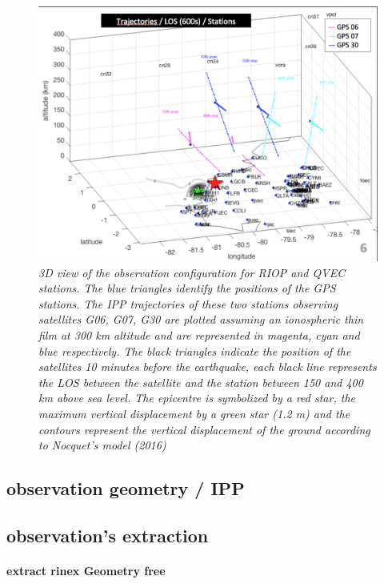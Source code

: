 \documentclass{gji}
\begin{document}
\begin{figure}
\begin{center}
\includegraphics[width=1\linewidth]{images/situation_map_3D.png}
\end{center}
\caption{ \textit{\emph{3D view of the observation configuration for RIOP and QVEC stations}. The blue triangles identify the positions of the GPS stations. The IPP trajectories of these two stations observing satellites G06, G07, G30 are plotted assuming an ionospheric thin film at 300 km altitude and are represented in magenta, cyan and blue respectively. The black triangles indicate the position of the satellites 10 minutes before the earthquake, each black line represents the LOS between the satellite and the station between 150 and 400 km above sea level. The epicentre is symbolized by a red star, the maximum vertical displacement by a green star (1.2 m) and the contours represent the vertical displacement of the ground according to Nocquet's model (2016)}} 

\label{superplot3D}
\end{figure}


	\subsection{observation geometry / IPP}
	\subsection{observation's extraction} 
       
       \paragraph{extract rinex Geometry free}
       
\end{document}
